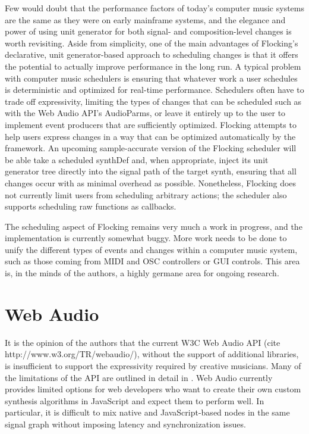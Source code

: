 \documentclass{article}
\begin{document}
Few would doubt that the performance factors of today's computer music systems are the same as they were on early mainframe systems, and the elegance and power of using unit generator for both signal- and composition-level changes is worth revisiting. Aside from simplicity, one of the main advantages of Flocking's declarative, unit generator-based approach to scheduling changes is that it offers the potential to actually improve performance in the long run. A typical problem with computer music schedulers is ensuring that whatever work a user schedules is deterministic and optimized for real-time performance. Schedulers often have to trade off expressivity, limiting the types of changes that can be scheduled such as with the Web Audio API's AudioParms, or leave it entirely up to the user to implement event producers that are sufficiently optimized. Flocking attempts to help users express changes in a way that can be optimized automatically by the framework. An upcoming sample-accurate version of the Flocking scheduler will be able take a scheduled synthDef and, when appropriate, inject its unit generator tree directly into the signal path of the target synth, ensuring that all changes occur with as minimal overhead as possible. Nonetheless, Flocking does not currently limit users from scheduling arbitrary actions; the scheduler also supports scheduling raw functions as callbacks.

The scheduling aspect of Flocking remains very much a work in progress, and the implementation is currently somewhat buggy. More work needs to be done to unify the different types of events and changes within a computer music system, such as those coming from MIDI and OSC controllers or GUI controls. This area is, in the minds of the authors, a highly germane area for ongoing research.

\section{Web Audio}

It is the opinion of the authors that the current W3C Web Audio API (cite http://www.w3.org/TR/webaudio/), without the support of additional libraries, is insufficient to support the expressivity required by creative musicians. Many of the limitations of the API are outlined in detail in \cite{DBLP:journals/comj/WyseS13}. Web Audio currently provides limited options for web developers who want to create their own custom synthesis algorithms in JavaScript and expect them to perform well. In particular, it is difficult to mix native and JavaScript-based nodes in the same signal graph without imposing latency and synchronization issues.
\end{document}
